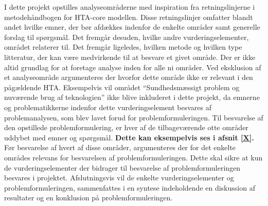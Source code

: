 I dette projekt opstilles analyseområderne med inspiration fra retningslinjerne i metodehåndbogen for HTA-core modellen. Disse retningslinjer omfatter blandt andet hvilke emner, der bør afdækkes indenfor de enkelte områder samt generelle forslag til spørgsmål. Det fremgår desuden, hvilke andre vurderingselementer, området relaterer til. Det fremgår ligeledes, hvilken metode og hvilken type litteratur, der kan være medvirkende til at besvare et givet område. \citep{HTAcore} 
Der er ikke altid grundlag for at foretage analyse inden for alle ni områder. Ved eksklusion af et analyseområde argumenteres der hvorfor dette område ikke er relevant i den pågældende HTA. \citep{HTAcore} Eksempelvis vil området “Sundhedsmæssigt problem og nuværende brug af teknologien” ikke blive inkluderet i dette projekt, da emnerne og problematikkerne indenfor dette vurderingselement besvares af problemanalysen, som blev lavet forud for problemformuleringen. 
Til besvarelse af den opstillede problemformulering, er hver af de tilbageværende otte områder uddybet med emner og spørgsmål. \textbf{Dette kan eksempelvis ses i afsnit \ref{X}.}
Før besvarelse af hvert af disse områder, argumenteres der for det enkelte områdes relevans for besvarelsen af problemformuleringen. Dette skal sikre at kun de vurderingselementer der bidrager til besvarelse af problemformuleringen besvares i projektet. %
Afslutningsvis vil de enkelte vurderingselementer og problemformuleringen, sammenfattes i en syntese indeholdende en diskussion af resultater og en konklusion på problemformuleringen. 

